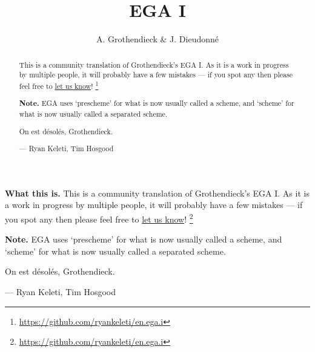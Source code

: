\documentclass{book}
\title{EGA I}
\author{A. Grothendieck \& J. Dieudonn{\'e}}
\begin{document}
\ifplastex
\textbf{What this is.}
    This is a community translation of Grothendieck's EGA I.
    As it is a work in progress by multiple people, it will probably have a few
    mistakes --- if you spot any then please feel free to
    \href{https://github.com/ryankeleti/en.ega.i/issues}{let us know}!
    \thanks{\url{https://github.com/ryankeleti/en.ega.i}}

\noindent
    \textbf{Note.} EGA uses `prescheme' for what is now usually called
    a scheme, and `scheme' for what is now usually called a
    separated scheme.
 
    On est d{\'e}sol{\'e}s, Grothendieck.

    --- Ryan Keleti, Tim Hosgood

\else

\renewcommand{\abstractname}{What this is}
\begin{abstract}
    This is a community translation of Grothendieck's EGA I.
    As it is a work in progress by multiple people, it will probably have a few
    mistakes --- if you spot any then please feel free to
    \href{https://github.com/ryankeleti/en.ega.i/issues}{let us know}!
    \thanks{\url{https://github.com/ryankeleti/en.ega.i}}

\noindent
    \textbf{Note.} EGA uses `prescheme' for what is now usually called
    a scheme, and `scheme' for what is now usually called a
    separated scheme.
 
    On est d{\'e}sol{\'e}s, Grothendieck.

    --- Ryan Keleti, Tim Hosgood
\end{abstract}

\fi

\maketitle


{
  \tableofcontents{}
}

\clearpage





\clearpage


\end{document}
